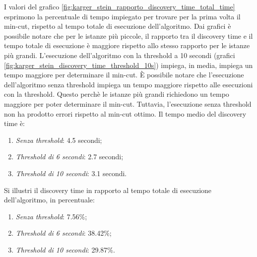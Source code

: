 I valori del grafico \ref{fig:karger_stein_rapporto_discovery_time_total_time} 
esprimono la percentuale di tempo impiegato per trovare per la prima 
volta il min-cut, rispetto al tempo totale di esecuzione dell'algoritmo.
Dai grafici è possibile notare che per le istanze più piccole, il rapporto 
tra il discovery time e il tempo totale di esecuzione è maggiore rispetto 
allo stesso rapporto per le istanze più grandi.
L'esecuzione dell'algoritmo con la threshold a 10 secondi (grafici 
\ref{fig:karger_stein_discovery_time_threshold_10s}) impiega, in media, 
impiega un tempo maggiore per determinare il min-cut. È possibile notare che 
l'esecuzione dell'algoritmo senza threshold impiega un tempo maggiore rispetto 
alle esecuzioni con la threshold. Questo perchè le istanze più grandi richiedono 
un tempo maggiore per poter determinare il min-cut. Tuttavia, l'esecuzione senza 
threshold non ha prodotto errori rispetto al min-cut ottimo. Il tempo medio del 
discovery time è:
\begin{enumerate}
	\item \textit{Senza threshold}: 4.5 secondi;
	\item \textit{Threshold di 6 secondi}: 2.7 secondi;
	\item \textit{Threshold di 10 secondi}: 3.1 secondi.
\end{enumerate}

Si illustri il discovery time in rapporto al tempo totale di esecuzione dell'algoritmo, in percentuale:
\begin{enumerate}
	\item \textit{Senza threshold}: 7.56\%;
	\item \textit{Threshold di 6 secondi}: 38.42\%;
	\item \textit{Threshold di 10 secondi}: 29.87\%.
\end{enumerate}

